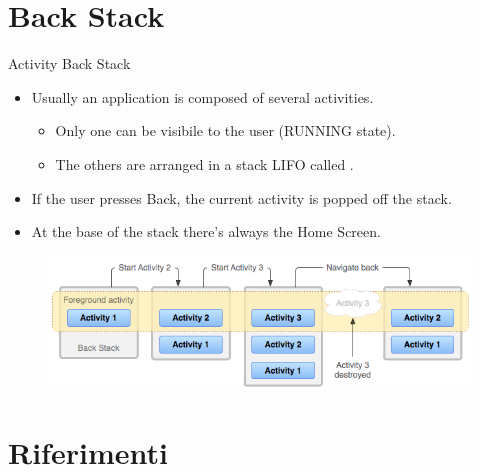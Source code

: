 \documentclass{beamer}
\begin{document}
\section{Back Stack}

\begin{frame}[allowframebreaks]{Activity Back Stack}
  \begin{itemize}
    \item Usually an application is composed of several activities.
    \begin{itemize}
      \item Only one can be visibile to the user (RUNNING state).
      \item The others are arranged in a stack LIFO called .
    \end{itemize}
    \item If the user presses Back, the current activity is popped off the stack.
    \item At the base of the stack there's always the Home Screen.
  \end{itemize}

  \begin{figure}
    \includegraphics[width=1\linewidth]{figures/diagram_backstack.png}
  \end{figure}

\end{frame}

\section*{Riferimenti}

\end{document}
